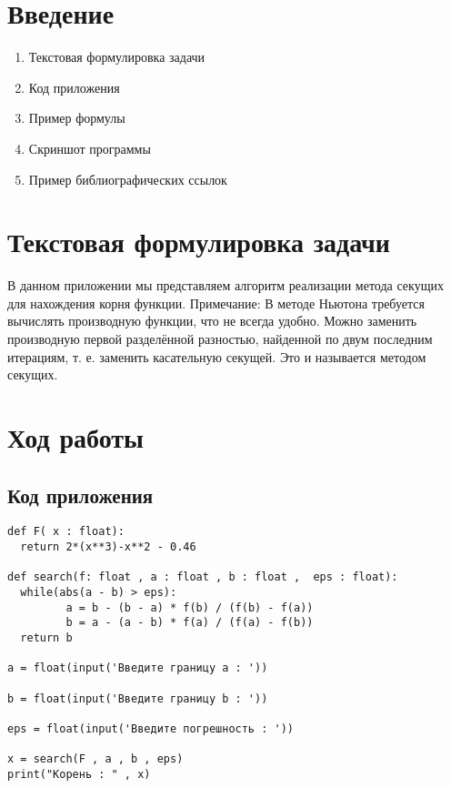 \documentclass[12pt,a4paper]{scrartcl}
\begin{document}
\section{Введение}
\label{sec:intro}

\begin{enumerate}
    \item Текстовая формулировка задачи
    \item Код приложения
    \item Пример формулы
    \item Скриншот программы
    \item Пример библиографических ссылок
\end{enumerate}

\section{Текстовая формулировка задачи}
\label{sec:exp:code}
\begin{mat}
В данном приложении мы представляем алгоритм реализации метода секущих для нахождения корня функции.
Примечание:
В методе Ньютона требуется вычислять производную функции, что не всегда удобно. Можно заменить производную первой разделённой разностью, найденной по двум последним итерациям, т. е. заменить касательную секущей. Это и называется методом секущих. 

\end{mat}

\section{Ход работы}
\label{sec:exp}

\subsection{Код приложения}
\label{sec:exp:code}
\begin{verbatim}
def F( x : float):
  return 2*(x**3)-x**2 - 0.46

def search(f: float , a : float , b : float ,  eps : float):
  while(abs(a - b) > eps):
         a = b - (b - a) * f(b) / (f(b) - f(a))
         b = a - (a - b) * f(a) / (f(a) - f(b))
  return b
  
a = float(input('Введите границу а : '))

b = float(input('Введите границу b : '))
 
eps = float(input('Введите погрешность : '))

x = search(F , a , b , eps)
print("Корень : " , x)

\end{verbatim}
\end{document}
